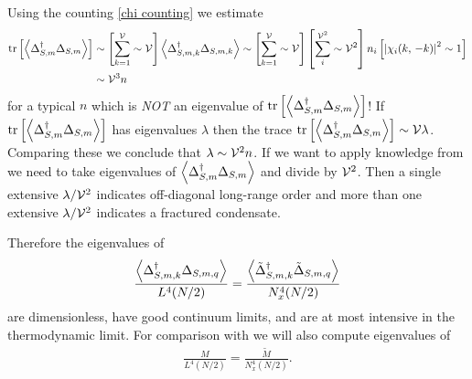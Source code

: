 Using the counting \eqref{chi counting} we estimate
\begin{align}
    \text{tr}\left[ \left\langle \Delta{}^{\dagger}_{S,m} \Delta_{S,m}  \right\rangle\right]
    &\sim
    \left[ \sum_{k=1}^{\mathcal{V}} \sim \mathcal{V}\right] \left\langle \Delta{}^{\dagger}_{S,m,k} \Delta_{S,m,k} \right\rangle
    \sim
    \left[\sum_{k=1}^{\mathcal{V}} \sim \mathcal{V}\right] \left[ \sum_i^{\mathcal{V}^2} \sim \mathcal{V}^2 \right] n_i \left[\left| \chi_i(k,\, -k) \right|^2 \sim 1 \right]
    \nonumber\\
    &\sim \mathcal{V}^3 n
\end{align}
for a typical $n$ which is \emph{NOT} an eigenvalue of $\text{tr}\left[ \left\langle \Delta{}^{\dagger}_{S,m} \Delta_{S,m}  \right\rangle\right]$!
If $\text{tr}\left[ \left\langle \Delta{}^{\dagger}_{S,m} \Delta_{S,m}  \right\rangle\right]$ has eigenvalues $\lambda$ then the trace $\text{tr}\left[ \left\langle \Delta{}^{\dagger}_{S,m} \Delta_{S,m}  \right\rangle\right] \sim \mathcal{V} \lambda$.
Comparing these we conclude that $\lambda \sim \mathcal{V}^2 n$.
If we want to apply knowledge from  we need to take eigenvalues of $\left\langle \Delta{}^{\dagger}_{S,m} \Delta_{S,m}  \right\rangle$ and divide by $\mathcal{V}^2$.
Then a single extensive $\lambda/\mathcal{V}^2$ indicates off-diagonal long-range order and more than one extensive $\lambda/\mathcal{V}^2$ indicates a fractured condensate.

Therefore the eigenvalues of 
\begin{align}
    \frac{\left\langle \Delta{}^{\dagger}_{S,m,k} \Delta_{S,m,q} \right\rangle}{L^4 (N/2)} = \frac{\left\langle \tilde{\Delta}{}^{\dagger}_{S,m,k} \tilde{\Delta}_{S,m,q} \right\rangle}{N_x^4 (N/2)}
\end{align}
are dimensionless, have good continuum limits, and are at most intensive in the thermodynamic limit.
For comparison with  we will also compute eigenvalues of
\begin{align}
    \frac{M}{L^4 (N/2)} = \frac{\tilde{M}}{N_x^4 (N/2)}.
\end{align}
